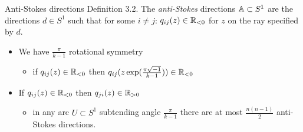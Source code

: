 \begin{frame}{Anti-Stokes directions}
Definition 3.2. The \emph{anti-Stokes} directions $\mathbb{A}\subset S^1$ are the
directions $d\in S^1$ such that for some $i \neq j$: $q_{ij}(z)\in\mathbb{R}_{<0}$ for
$z$ on the ray specified by $d$.
  \begin{center}
  \end{center}
  \begin{itemize}
    \item We have $\frac{\pi}{k-1}$ rotational symmetry
      \begin{itemize}
        \item if $q_{ij}(z)\in\mathbb{R}_{<0}$ then
          $q_{ij}(z\exp(\frac{\pi\sqrt{-1}}{k-1}))\in\mathbb{R}_{<0}$
      \end{itemize}
    \item If $q_{ij}(z)\in\mathbb{R}_{<0}$ then $q_{ji}(z)\in\mathbb{R}_{>0}$
      \begin{itemize}
        \item in any arc $U \subset S^1$ subtending angle $\frac{\pi}{k − 1}$
          there are at most $\frac{n(n − 1)}{2}$ anti-Stokes directions.
      \end{itemize}
  \end{itemize}
\end{frame}

